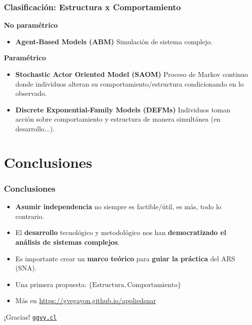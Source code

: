 \documentclass[aspectratio=169]{beamer}
\begin{document}
\begin{frame}
	\frametitle{Clasificación: Estructura x Comportamiento}
\pause
	\textbf{No paramétrico}
	\begin{itemize}
		\item \textbf{Agent-Based Models (ABM)} Simulación de sistema complejo.
	\end{itemize}
\pause
	\textbf{Paramétrico}
	\begin{itemize}
		\item \textbf{Stochastic Actor Oriented Model (SAOM)} Proceso de Markov continuo donde individuos alteran su comportamiento/estructura condicionando en lo observado.
		\item \textbf{Discrete Exponential-Family Models (DEFMs)} Individuos toman acción sobre comportamiento y estructura de manera simultánea (en desarrollo...).
	\end{itemize}


\end{frame}

\section{Conclusiones}

\begin{frame}
	\frametitle{Conclusiones}
	\pause
	\begin{itemize}
		\item \textbf{Asumir independencia} no siempre es factible/útil, es más, todo lo contrario.\pause
		\item El \textbf{desarrollo} tecnológico y metodológico nos han \textbf{democratizado el análisis de sistemas complejos}.\pause
		\item Es importante crear un \textbf{marco teórico} para \textbf{guiar la práctica} del ARS (SNA).\pause
		\item Una primera propuesta: $\{\mbox{Estructura},\mbox{Comportamiento}\}$\pause
		\item Más en \url{https://gvegayon.github.io/appliedsnar}
	\end{itemize}
\end{frame}

\begin{frame}
	\centering
	\Huge ¡Gracias! \normalsize 
\titlepage%
\vfill\hfill  \href{https://ggvy.cl}{\texttt{ggvy.cl}}
\end{frame}
\end{document}
